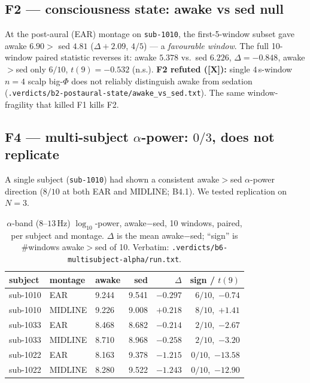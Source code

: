 \documentclass[11pt,a4paper]{article}
\providecommand{\tierRed}{\textbf{[X]}}     %
\begin{document}
\subsection{F2 --- consciousness state: awake vs sed null}
\label{sub:f2}

At the post-aural (EAR) montage on \texttt{sub-1010}, the first-5-window subset
gave awake $6.90 >$ sed $4.81$ ($\Delta{+}2.09$, $4/5$) --- a \emph{favourable
window}. The full 10-window paired statistic reverses it:
awake $5.378$ vs.\ sed $6.226$, $\Delta{=}{-}0.848$, awake$>$sed only $6/10$,
$t(9){=}{-}0.532$ (n.s.). \textbf{F2 refuted (\tierRed):} single $4\,$s-window
$n{=}4$ scalp big-$\Phi$ does not reliably distinguish awake from sedation
(\texttt{.verdicts/b2-postaural-state/awake\_vs\_sed.txt}). The same
window-fragility that killed F1 kills F2.

\subsection{F4 --- multi-subject $\alpha$-power: $0/3$, does not replicate}
\label{sub:f4}

A single subject (\texttt{sub-1010}) had shown a consistent awake$>$sed
$\alpha$-power direction ($8/10$ at both EAR and MIDLINE; B4.1). We tested
replication on $N{=}3$.

\begin{table}[h]
\centering
\caption{$\alpha$-band ($8$--$13\,$Hz) $\log_{10}$-power, awake$-$sed, 10
windows, paired, per subject and montage. $\Delta$ is the mean awake$-$sed;
``sign'' is \#windows awake$>$sed of 10. Verbatim:
\texttt{.verdicts/b6-multisubject-alpha/run.txt}.}
\label{tab:f4}
\small
\begin{tabular}{@{}lllrrr@{}}
\toprule
subject & montage & awake & sed & $\Delta$ & sign / $t(9)$ \\
\midrule
sub-1010 & EAR     & 9.244 & 9.541 & $-0.297$ & $6/10$,\ $-0.74$ \\
sub-1010 & MIDLINE & 9.226 & 9.008 & $+0.218$ & $8/10$,\ $+1.41$ \\
sub-1033 & EAR     & 8.468 & 8.682 & $-0.214$ & $2/10$,\ $-2.67$ \\
sub-1033 & MIDLINE & 8.710 & 8.968 & $-0.258$ & $2/10$,\ $-3.20$ \\
sub-1022 & EAR     & 8.163 & 9.378 & $-1.215$ & $0/10$,\ $-13.58$ \\
sub-1022 & MIDLINE & 8.280 & 9.522 & $-1.243$ & $0/10$,\ $-12.90$ \\
\bottomrule
\end{tabular}
\end{table}
\end{document}
